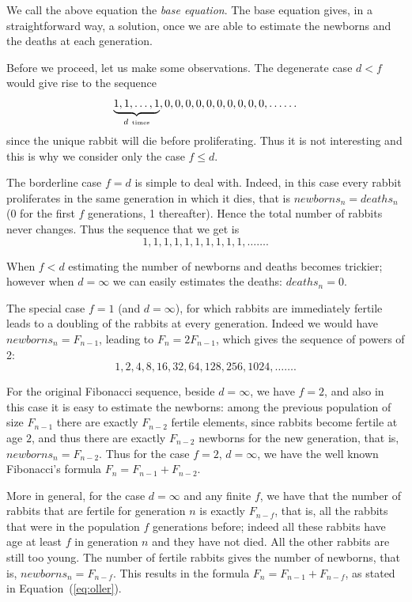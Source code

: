 \documentclass[11pt,epsf]{article}
\begin{document}
\bigskip

\noindent
We call the above equation the {\em base equation}.
The base equation gives, in a straightforward way, a solution, once we are able to estimate the
newborns and the deaths at each generation. 

\bigskip

Before we proceed,
let us make some observations.
%
The degenerate case $d<f$ would give rise to the sequence 
$$\underbrace{1,1,\ldots,1}_{d\makebox{ {\tiny times}}},0,0,0,0,0,0,0,0,0,0,\ldots\ldots$$
since the unique rabbit will die before proliferating. 
Thus it is not interesting and this is why we consider only the case $f\le d$.

The borderline case $f=d$ is simple to deal with. Indeed, in this case every rabbit
proliferates in the same generation in which it dies, that is $newborns_n=deaths_n$ (0 for the first $f$ generations, 1 thereafter). 
Hence the total number of rabbits never changes. Thus the sequence that we get is
$$1,1,1,1,1,1,1,1,1,1,\ldots\ldots.$$

\medskip

When $f<d$ estimating the number of newborns and deaths becomes trickier; however when $d=\infty$ we can easily estimates
the deaths: $deaths_n=0$.

The special case $f=1$ (and $d=\infty$), for which rabbits are immediately fertile leads to a doubling of the rabbits
at every generation. Indeed we would have $newborns_n=F_{n-1}$, leading to $F_n=2F_{n-1}$, which gives the sequence of powers of 2:
$$1,2,4,8,16,32,64,128,256,1024,\ldots\ldots.$$

For the original Fibonacci sequence, beside $d=\infty$, we have $f=2$, and also in this case it is easy to
estimate the newborns: among the previous population of size $F_{n-1}$ there are exactly $F_{n-2}$
fertile elements, since
rabbits become fertile at age $2$, and thus there are exactly $F_{n-2}$ newborns for the new generation,
that is, $newborns_n=F_{n-2}$. 
Thus for the case $f=2$, $d=\infty$, we have the well known Fibonacci's formula $F_n=F_{n-1}+F_{n-2}.$

More in general, for the case $d=\infty$ and any finite $f$, we have that the number of rabbits that are
fertile for generation $n$ is exactly $F_{n-f}$, that is, all the rabbits that were in the population $f$
generations before; indeed all these rabbits have age at least $f$ in generation $n$ and they have not died.
All the other rabbits are still too young. The number of
fertile rabbits gives the number of newborns, that is, $newborns_n=F_{n-f}$.
This results in the formula $F_n=F_{n-1}+F_{n-f}$, as stated in Equation~(\ref{eq:oller}).
\end{document}
